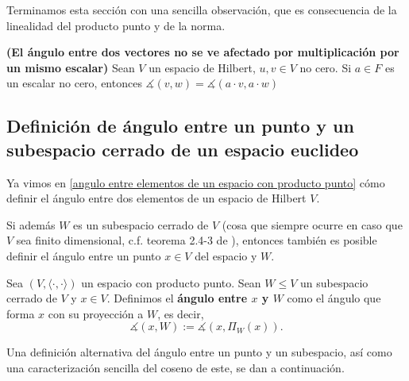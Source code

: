 Terminamos esta sección con una sencilla observación, que es 
consecuencia de la linealidad del producto punto y de la norma.

\begin{obs}
\label{obs: angulo se preserva por mult. esc.}
\textbf{(El ángulo entre dos vectores no se ve afectado
por multiplicación por un mismo escalar)}
Sean $V$ un espacio de Hilbert, $u, v \in V$ no cero.
Si $a \in F$ es un escalar no cero, entonces
$\measuredangle (v, w) = \measuredangle (a \cdot v, a \cdot w)$
\end{obs}

\subsection{Definición de ángulo entre un punto y un subespacio cerrado de un espacio euclideo}
\label{sec: def del angulo entre un punto y un subespacio cerrado}

Ya vimos en \ref{angulo entre elementos de un espacio con producto punto}
cómo definir el ángulo entre dos elementos de un espacio
de Hilbert $V$.

Si además $W$ es un subespacio cerrado de $V$
(cosa que siempre ocurre en caso que
$V$ sea finito dimensional, c.f. teorema 2.4-3 de \cite{Kreyszig}), entonces también
es posible definir el ángulo entre un punto $x \in V$
del espacio y $W$.

\begin{defi} \label{def: angulo punto subespacio}
Sea $(V, \langle \cdot , \cdot \rangle)$ un espacio con 
producto punto. Sean $W \leq V$ un subespacio cerrado de $V$
y $x \in V$. Definimos el \textbf{ángulo entre $x$ y $W$}
como el ángulo que forma 
$x$ con su proyección a $W$, es decir,
\[
\measuredangle (x, W):= \measuredangle(x, \Pi_{W}(x)).
\]
\end{defi}

Una definición alternativa del ángulo entre un punto y un subespacio,
así como una caracterización sencilla del coseno de este,
se dan a continuación.

